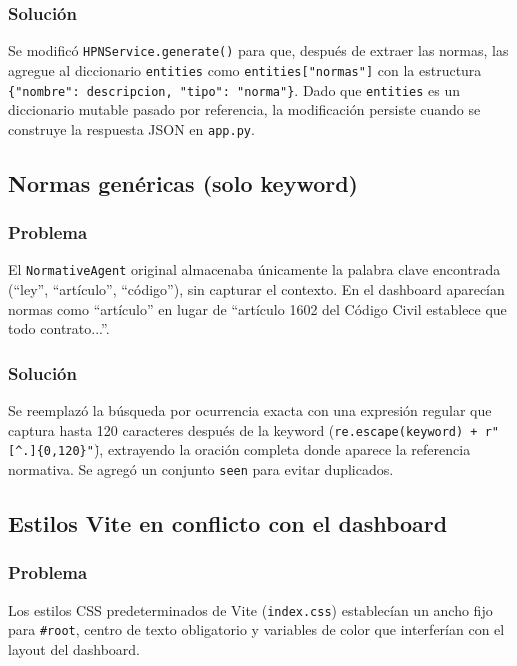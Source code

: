 \documentclass[12pt, letterpaper]{article}
\begin{document}
\subsubsection*{Solución}

Se modificó \texttt{HPNService.generate()} para que, después de
extraer las normas, las agregue al diccionario \texttt{entities}
como \texttt{entities["normas"]} con la estructura
\texttt{\{"nombre": descripcion, "tipo": "norma"\}}. Dado que
\texttt{entities} es un diccionario mutable pasado por referencia, la
modificación persiste cuando se construye la respuesta JSON en
\texttt{app.py}.

\subsection{Normas genéricas (solo keyword)}

\subsubsection*{Problema}

El \texttt{NormativeAgent} original almacenaba únicamente la palabra
clave encontrada (``ley'', ``artículo'', ``código''), sin capturar
el contexto. En el dashboard aparecían normas como ``artículo'' en
lugar de ``artículo 1602 del Código Civil establece que todo
contrato...''.

\subsubsection*{Solución}

Se reemplazó la búsqueda por ocurrencia exacta con una expresión
regular que captura hasta 120 caracteres después de la keyword
(\texttt{re.escape(keyword) + r"[\^{}.]\{0,120\}\."}), extrayendo la
oración completa donde aparece la referencia normativa. Se agregó
un conjunto \texttt{seen} para evitar duplicados.

\subsection{Estilos Vite en conflicto con el dashboard}

\subsubsection*{Problema}

Los estilos CSS predeterminados de Vite (\texttt{index.css})
establecían un ancho fijo para \texttt{\#root}, centro de texto
obligatorio y variables de color que interferían con el layout del
dashboard.
\end{document}
